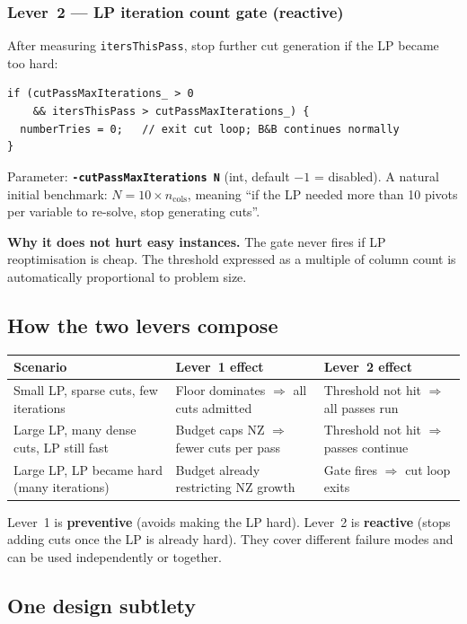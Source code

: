 \documentclass[11pt,a4paper]{article}
\begin{document}
\subsubsection*{Lever~2 --- LP iteration count gate (reactive)}

After measuring \texttt{itersThisPass}, stop further cut generation
if the LP became too hard:

\begin{lstlisting}
if (cutPassMaxIterations_ > 0
    && itersThisPass > cutPassMaxIterations_) {
  numberTries = 0;   // exit cut loop; B&B continues normally
}
\end{lstlisting}

Parameter: \textbf{\texttt{-cutPassMaxIterations N}} (int, default
$-1$ = disabled).  A natural initial benchmark: $N = 10 \times
n_{\text{cols}}$, meaning ``if the LP needed more than 10 pivots per
variable to re-solve, stop generating cuts''.

\textbf{Why it does not hurt easy instances.}  The gate never fires
if LP reoptimisation is cheap.  The threshold expressed as a multiple
of column count is automatically proportional to problem size.

\subsection*{How the two levers compose}

\begin{tabular}{p{4cm}p{4.5cm}p{4.5cm}}
\toprule
\textbf{Scenario} & \textbf{Lever~1 effect} & \textbf{Lever~2 effect}\\
\midrule
Small LP, sparse cuts, few iterations &
  Floor dominates $\Rightarrow$ all cuts admitted &
  Threshold not hit $\Rightarrow$ all passes run\\
Large LP, many dense cuts, LP still fast &
  Budget caps NZ $\Rightarrow$ fewer cuts per pass &
  Threshold not hit $\Rightarrow$ passes continue\\
Large LP, LP became hard (many iterations) &
  Budget already restricting NZ growth &
  Gate fires $\Rightarrow$ cut loop exits\\
\bottomrule
\end{tabular}

Lever~1 is \textbf{preventive} (avoids making the LP hard).
Lever~2 is \textbf{reactive} (stops adding cuts once the LP is already
hard).  They cover different failure modes and can be used
independently or together.

\subsection*{One design subtlety}
\end{document}
